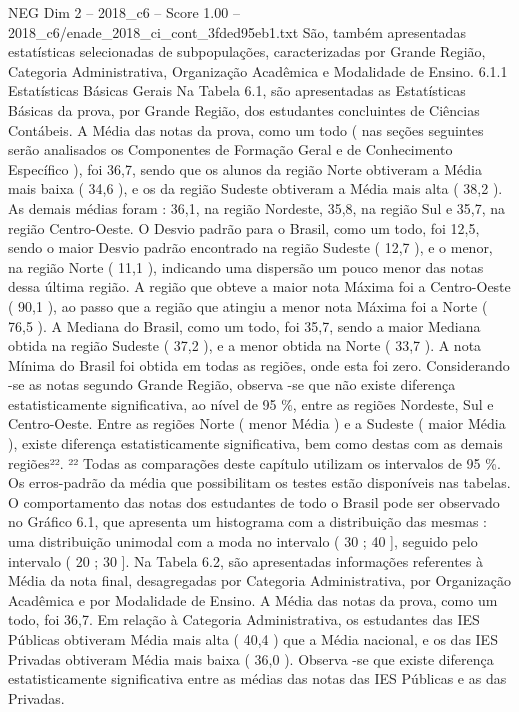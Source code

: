 \begin{textsample}{NEG Dim 2 – 2018\_c6 – Score 1.00 – 2018\_c6/enade\_2018\_ci\_cont\_3fded95eb1.txt}
São, também apresentadas estatísticas selecionadas de subpopulações, caracterizadas por Grande Região, Categoria Administrativa, Organização Acadêmica e Modalidade de Ensino. 6.1.1 Estatísticas Básicas Gerais Na Tabela 6.1, são apresentadas as Estatísticas Básicas da prova, por Grande Região, dos estudantes concluintes de Ciências Contábeis.
A Média das notas da prova, como um todo ( nas seções seguintes serão analisados os Componentes de Formação Geral e de Conhecimento Específico ), foi 36,7, sendo que os alunos da região Norte obtiveram a Média mais baixa ( 34,6 ), e os da região Sudeste obtiveram a Média mais alta ( 38,2 ).
As demais médias foram : 36,1, na região Nordeste, 35,8, na região Sul e 35,7, na região Centro-Oeste.
O Desvio padrão para o Brasil, como um todo, foi 12,5, sendo o maior Desvio padrão encontrado na região Sudeste ( 12,7 ), e o menor, na região Norte ( 11,1 ), indicando uma dispersão um pouco menor das notas dessa última região.
A região que obteve a maior nota Máxima foi a Centro-Oeste ( 90,1 ), ao passo que a região que atingiu a menor nota Máxima foi a Norte ( 76,5 ).
A Mediana do Brasil, como um todo, foi 35,7, sendo a maior Mediana obtida na região Sudeste ( 37,2 ), e a menor obtida na Norte ( 33,7 ).
A nota Mínima do Brasil foi obtida em todas as regiões, onde esta foi zero.
Considerando -se as notas segundo Grande Região, observa -se que não existe diferença estatisticamente significativa, ao nível de 95 \%, entre as regiões Nordeste, Sul e Centro-Oeste.
Entre as regiões Norte ( menor Média ) e a Sudeste ( maior Média ), existe diferença estatisticamente significativa, bem como destas com as demais regiões²². ²² Todas as comparações deste capítulo utilizam os intervalos de 95 \%.
Os erros-padrão da média que possibilitam os testes estão disponíveis nas tabelas.
O comportamento das notas dos estudantes de todo o Brasil pode ser observado no Gráfico 6.1, que apresenta um histograma com a distribuição das mesmas : uma distribuição unimodal com a moda no intervalo ( 30 ; 40 ], seguido pelo intervalo ( 20 ; 30 ].
Na Tabela 6.2, são apresentadas informações referentes à Média da nota final, desagregadas por Categoria Administrativa, por Organização Acadêmica e por Modalidade de Ensino.
A Média das notas da prova, como um todo, foi 36,7.
Em relação à Categoria Administrativa, os estudantes das IES Públicas obtiveram Média mais alta ( 40,4 ) que a Média nacional, e os das IES Privadas obtiveram Média mais baixa ( 36,0 ).
Observa -se que existe diferença estatisticamente significativa entre as médias das notas das IES Públicas e as das Privadas.

\end{textsample}

